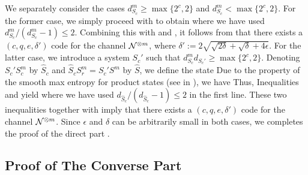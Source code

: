\documentclass[journal]{IEEEtran}
\begin{document}
We separately consider the cases $d_{S_c}^m\geq\max\{2^c,2\}$ and $d_{S_c}^m<\max\{2^c,2\}$.
For the former case, we simply proceed with  to obtain
where we have used $d_{S_c}^m/(d_{S_c}^m-1)\leq2$.
Combining this with  and , it follows from  that there exists a $(c,q,e,\delta')$ code for the channel ${\mathcal N}^{\otimes m}$, where $\delta':=2\sqrt{\sqrt{2\delta}+\sqrt{\delta}+4\epsilon}$.
For the latter case, we introduce a system $S_c'$ such that $d_{S_c}^md_{S_c'}\geq\max\{2^c,2\}$.
Denoting $S_c'S_c^m$ by $\hat{S}_c$ and $\hat{S}_cS_r^m=S_c'S^m$ by $\hat{S}$, we define the state
Due to the property of the smooth max entropy for product states (see  in ), we have
Thus, Inequalities  and  yield
where we have used $d_{\hat{S}_c}/(d_{\hat{S}_c}-1)\leq2$ in the first line.
These two inequalities together with  imply that there exists a $(c,q,e,\delta')$ code for the channel ${\mathcal N}^{\otimes m}$.
Since $\epsilon$ and $\delta$ can be arbitrarily small in both cases, we completes the proof of the direct part .
\QED

\hfill





\subsection{Proof of The Converse Part}
\end{document}
